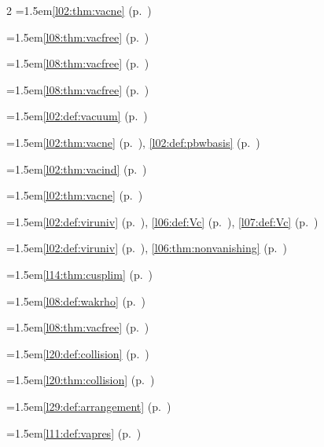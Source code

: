 \begin{multicols}{2}
\hangindent=1.5em\quad \ref{l02:thm:vacne} (p.~\pageref{l02:thm:vacne})\par
\hangindent=1.5em\quad \ref{l08:thm:vacfree} (p.~\pageref{l08:thm:vacfree})\par
\hangindent=1.5em\quad \ref{l08:thm:vacfree} (p.~\pageref{l08:thm:vacfree})\par
\hangindent=1.5em\quad \ref{l08:thm:vacfree} (p.~\pageref{l08:thm:vacfree})\par
\hangindent=1.5em\quad \ref{l02:def:vacuum} (p.~\pageref{l02:def:vacuum})\par
\hangindent=1.5em\quad \ref{l02:thm:vacne} (p.~\pageref{l02:thm:vacne}), \ref{l02:def:pbwbasis} (p.~\pageref{l02:def:pbwbasis})\par
\hangindent=1.5em\quad \ref{l02:thm:vacind} (p.~\pageref{l02:thm:vacind})\par
\hangindent=1.5em\quad \ref{l02:thm:vacne} (p.~\pageref{l02:thm:vacne})\par
\hangindent=1.5em\quad \ref{l02:def:viruniv} (p.~\pageref{l02:def:viruniv}), \ref{l06:def:Vc} (p.~\pageref{l06:def:Vc}), \ref{l07:def:Vc} (p.~\pageref{l07:def:Vc})\par
\hangindent=1.5em\quad \ref{l02:def:viruniv} (p.~\pageref{l02:def:viruniv}), \ref{l06:thm:nonvanishing} (p.~\pageref{l06:thm:nonvanishing})\par
\hangindent=1.5em\quad \ref{l14:thm:cusplim} (p.~\pageref{l14:thm:cusplim})\par
\hangindent=1.5em\quad \ref{l08:def:wakrho} (p.~\pageref{l08:def:wakrho})\par
\hangindent=1.5em\quad \ref{l08:thm:vacfree} (p.~\pageref{l08:thm:vacfree})\par
\hangindent=1.5em\quad \ref{l20:def:collision} (p.~\pageref{l20:def:collision})\par
\hangindent=1.5em\quad \ref{l20:thm:collision} (p.~\pageref{l20:thm:collision})\par
\hangindent=1.5em\quad \ref{l29:def:arrangement} (p.~\pageref{l29:def:arrangement})\par
\hangindent=1.5em\quad \ref{l11:def:vapres} (p.~\pageref{l11:def:vapres})\par

\end{multicols}
